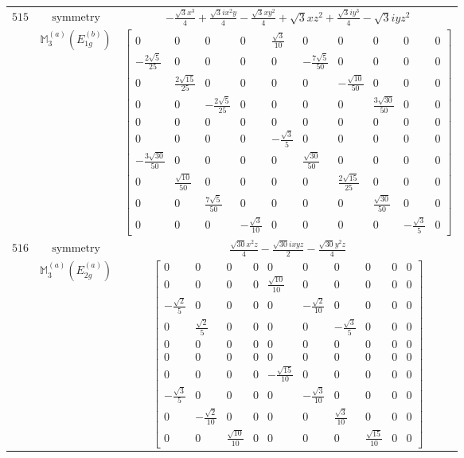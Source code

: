 \documentclass[fleqn,8pt,landscape]{jsarticle}
\begin{document}
\begin{longtable}{ccc}
$ 515 $ & $ \text{symmetry} $ & $ - \frac{\sqrt{3} x^{3}}{4} + \frac{\sqrt{3} i x^{2} y}{4} - \frac{\sqrt{3} x y^{2}}{4} + \sqrt{3} x z^{2} + \frac{\sqrt{3} i y^{3}}{4} - \sqrt{3} i y z^{2} $ \\
$  $ & $ \mathbb{M}_{3}^{(a)}(E_{1g}^{(b)}) $ & $ \begin{bmatrix} 0 & 0 & 0 & 0 & \frac{\sqrt{3}}{10} & 0 & 0 & 0 & 0 & 0 \\ - \frac{2 \sqrt{5}}{25} & 0 & 0 & 0 & 0 & - \frac{7 \sqrt{5}}{50} & 0 & 0 & 0 & 0 \\ 0 & \frac{2 \sqrt{15}}{25} & 0 & 0 & 0 & 0 & - \frac{\sqrt{10}}{50} & 0 & 0 & 0 \\ 0 & 0 & - \frac{2 \sqrt{5}}{25} & 0 & 0 & 0 & 0 & \frac{3 \sqrt{30}}{50} & 0 & 0 \\ 0 & 0 & 0 & 0 & 0 & 0 & 0 & 0 & 0 & 0 \\ 0 & 0 & 0 & 0 & - \frac{\sqrt{3}}{5} & 0 & 0 & 0 & 0 & 0 \\ - \frac{3 \sqrt{30}}{50} & 0 & 0 & 0 & 0 & \frac{\sqrt{30}}{50} & 0 & 0 & 0 & 0 \\ 0 & \frac{\sqrt{10}}{50} & 0 & 0 & 0 & 0 & \frac{2 \sqrt{15}}{25} & 0 & 0 & 0 \\ 0 & 0 & \frac{7 \sqrt{5}}{50} & 0 & 0 & 0 & 0 & \frac{\sqrt{30}}{50} & 0 & 0 \\ 0 & 0 & 0 & - \frac{\sqrt{3}}{10} & 0 & 0 & 0 & 0 & - \frac{\sqrt{3}}{5} & 0 \end{bmatrix} $ \\ \hline
$ 516 $ & $ \text{symmetry} $ & $ \frac{\sqrt{30} x^{2} z}{4} - \frac{\sqrt{30} i x y z}{2} - \frac{\sqrt{30} y^{2} z}{4} $ \\
$  $ & $ \mathbb{M}_{3}^{(a)}(E_{2g}^{(a)}) $ & $ \begin{bmatrix} 0 & 0 & 0 & 0 & 0 & 0 & 0 & 0 & 0 & 0 \\ 0 & 0 & 0 & 0 & \frac{\sqrt{10}}{10} & 0 & 0 & 0 & 0 & 0 \\ - \frac{\sqrt{2}}{5} & 0 & 0 & 0 & 0 & - \frac{\sqrt{2}}{10} & 0 & 0 & 0 & 0 \\ 0 & \frac{\sqrt{2}}{5} & 0 & 0 & 0 & 0 & - \frac{\sqrt{3}}{5} & 0 & 0 & 0 \\ 0 & 0 & 0 & 0 & 0 & 0 & 0 & 0 & 0 & 0 \\ 0 & 0 & 0 & 0 & 0 & 0 & 0 & 0 & 0 & 0 \\ 0 & 0 & 0 & 0 & - \frac{\sqrt{15}}{10} & 0 & 0 & 0 & 0 & 0 \\ - \frac{\sqrt{3}}{5} & 0 & 0 & 0 & 0 & - \frac{\sqrt{3}}{10} & 0 & 0 & 0 & 0 \\ 0 & - \frac{\sqrt{2}}{10} & 0 & 0 & 0 & 0 & \frac{\sqrt{3}}{10} & 0 & 0 & 0 \\ 0 & 0 & \frac{\sqrt{10}}{10} & 0 & 0 & 0 & 0 & \frac{\sqrt{15}}{10} & 0 & 0 \end{bmatrix} $ \\ \hline

\end{longtable}
\end{document}
